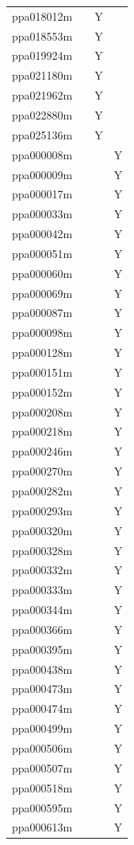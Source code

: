 \documentclass[12pt]{article}
\begin{document}
\begin{center}
\begin{longtable}{llll}
	ppa018012m & &Y & \\
	ppa018553m & &Y & \\
	ppa019924m & &Y & \\
	ppa021180m & &Y & \\
	ppa021962m & &Y & \\
	ppa022880m & &Y & \\
	ppa025136m & &Y & \\
	ppa000008m & & &Y \\
	ppa000009m & & &Y \\
	ppa000017m & & &Y \\
	ppa000033m & & &Y \\
	ppa000042m & & &Y \\
	ppa000051m & & &Y \\
	ppa000060m & & &Y \\
	ppa000069m & & &Y \\
	ppa000087m & & &Y \\
	ppa000098m & & &Y \\
	ppa000128m & & &Y \\
	ppa000151m & & &Y \\
	ppa000152m & & &Y \\
	ppa000208m & & &Y \\
	ppa000218m & & &Y \\
	ppa000246m & & &Y \\
	ppa000270m & & &Y \\
	ppa000282m & & &Y \\
	ppa000293m & & &Y \\
	ppa000320m & & &Y \\
	ppa000328m & & &Y \\
	ppa000332m & & &Y \\
	ppa000333m & & &Y \\
	ppa000344m & & &Y \\
	ppa000366m & & &Y \\
	ppa000395m & & &Y \\
	ppa000438m & & &Y \\
	ppa000473m & & &Y \\
	ppa000474m & & &Y \\
	ppa000499m & & &Y \\
	ppa000506m & & &Y \\
	ppa000507m & & &Y \\
	ppa000518m & & &Y \\
	ppa000595m & & &Y \\
	ppa000613m & & &Y \\

\end{longtable}
\end{center}
\end{document}
